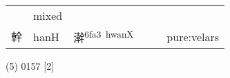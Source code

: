 \documentclass[14pt,a4paper]{scrartcl}
\begin{document}
\begin{longtable}[c]{@{}llllll@{}}
\begin{minipage}[t]{0.14\columnwidth}
\strut\end{minipage} &
\begin{minipage}[t]{0.14\columnwidth}\raggedright\strut
mixed
\strut\end{minipage}\tabularnewline
\begin{minipage}[t]{0.14\columnwidth}\raggedright\strut
幹
\strut\end{minipage} &
\begin{minipage}[t]{0.14\columnwidth}\raggedright\strut
hanH
\strut\end{minipage} &
\begin{minipage}[t]{0.14\columnwidth}\raggedright\strut
澣\textsuperscript{6fa3~hwanX}
\strut\end{minipage} &
\begin{minipage}[t]{0.14\columnwidth}\raggedright\strut
\strut\end{minipage} &
\begin{minipage}[t]{0.14\columnwidth}\raggedright\strut
\strut\end{minipage} &
\begin{minipage}[t]{0.14\columnwidth}\raggedright\strut
pure:velars
\strut\end{minipage}\tabularnewline
\bottomrule
\end{longtable}

(5) 0157 {[}2{]}
\end{document}

